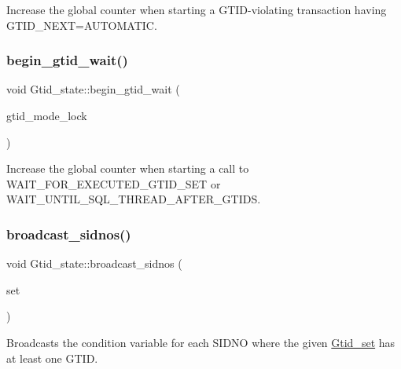 Increase the global counter when starting a G\+T\+ID-\/violating transaction having G\+T\+I\+D\+\_\+\+N\+E\+XT=A\+U\+T\+O\+M\+A\+T\+IC. \mbox{\label{classGtid__state_ab955f90f6b725047427f721154020ea5}} 
\subsubsection{\texorpdfstring{begin\+\_\+gtid\+\_\+wait()}{begin\_gtid\_wait()}}
{\footnotesize\ttfamily void Gtid\+\_\+state\+::begin\+\_\+gtid\+\_\+wait (\begin{DoxyParamCaption}\item[{enum\+\_\+gtid\+\_\+mode\+\_\+lock}]{gtid\+\_\+mode\+\_\+lock }\end{DoxyParamCaption})\hspace{0.3cm}{\ttfamily [inline]}}

Increase the global counter when starting a call to W\+A\+I\+T\+\_\+\+F\+O\+R\+\_\+\+E\+X\+E\+C\+U\+T\+E\+D\+\_\+\+G\+T\+I\+D\+\_\+\+S\+ET or W\+A\+I\+T\+\_\+\+U\+N\+T\+I\+L\+\_\+\+S\+Q\+L\+\_\+\+T\+H\+R\+E\+A\+D\+\_\+\+A\+F\+T\+E\+R\+\_\+\+G\+T\+I\+DS. \mbox{\label{classGtid__state_acf75c15c777ea5fc24e6bb6c3874974e}} 
\subsubsection{\texorpdfstring{broadcast\+\_\+sidnos()}{broadcast\_sidnos()}}
{\footnotesize\ttfamily void Gtid\+\_\+state\+::broadcast\+\_\+sidnos (\begin{DoxyParamCaption}\item[{const \mbox{\hyperlink{classGtid__set}{Gtid\+\_\+set}} $\ast$}]{set }\end{DoxyParamCaption})}

Broadcasts the condition variable for each S\+I\+D\+NO where the given \mbox{\hyperlink{classGtid__set}{Gtid\+\_\+set}} has at least one G\+T\+ID. \mbox{\label{classGtid__state_ad923504d43e3b912ab1aaad9bb65a8b7}} 
